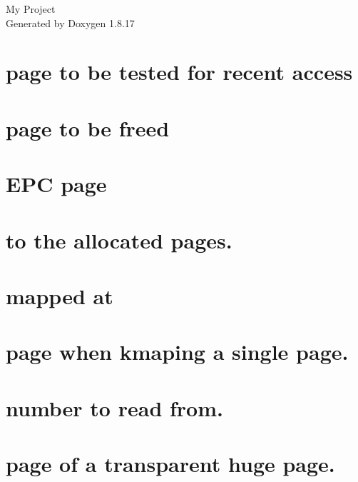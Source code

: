 \let\mypdfximage\pdfximage\def\pdfximage{\immediate\mypdfximage}\documentclass[twoside]{book}
\newcommand{\+}{\discretionary{\mbox{\scriptsize$\hookleftarrow$}}{}{}}
\newcommand{\clearemptydoublepage}{%
  \newpage{\pagestyle{empty}\cleardoublepage}%
}
\begin{document}
\hypersetup{pageanchor=false,
             bookmarksnumbered=true,
             pdfencoding=unicode
            }
\begin{titlepage}
\vspace*{7cm}
\begin{center}%
{\Large My Project }\\
\vspace*{1cm}
{\large Generated by Doxygen 1.8.17}\\
\end{center}
\end{titlepage}
\clearemptydoublepage
{}
\tableofcontents
\clearemptydoublepage
{}
\hypersetup{pageanchor=true}

\chapter{page to be tested for recent access}
\label{enclave}

\chapter{page to be freed}
\label{EPC}

\chapter{E\+PC page}
\label{an}

\chapter{to the allocated pages.}
\label{Pointer}

\chapter{mapped at}
\label{is}

\chapter{page when kmap\textquotesingle{}ing a single page.}
\label{The}

\chapter{number to read from.}
\label{Page}

\chapter{page of a transparent huge page.}
\label{Head}

\end{document}
